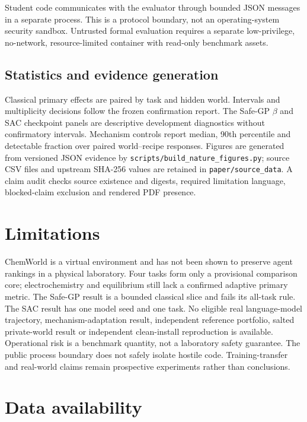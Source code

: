 \documentclass[11pt]{article}
\begin{document}
Student code communicates with the evaluator through bounded JSON messages in a separate process. This is a protocol boundary, not an operating-system security sandbox. Untrusted formal evaluation requires a separate low-privilege, no-network, resource-limited container with read-only benchmark assets.

\subsection*{Statistics and evidence generation}

Classical primary effects are paired by task and hidden world. Intervals and multiplicity decisions follow the frozen confirmation report. The Safe-GP $\beta$ and SAC checkpoint panels are descriptive development diagnostics without confirmatory intervals. Mechanism controls report median, 90th percentile and detectable fraction over paired world--recipe responses. Figures are generated from versioned JSON evidence by \texttt{scripts/build\_nature\_figures.py}; source CSV files and upstream SHA-256 values are retained in \texttt{paper/source\_data}. A claim audit checks source existence and digests, required limitation language, blocked-claim exclusion and rendered PDF presence.

\section*{Limitations}

ChemWorld is a virtual environment and has not been shown to preserve agent rankings in a physical laboratory. Four tasks form only a provisional comparison core; electrochemistry and equilibrium still lack a confirmed adaptive primary metric. The Safe-GP result is a bounded classical slice and fails its all-task rule. The SAC result has one model seed and one task. No eligible real language-model trajectory, mechanism-adaptation result, independent reference portfolio, salted private-world result or independent clean-install reproduction is available. Operational risk is a benchmark quantity, not a laboratory safety guarantee. The public process boundary does not safely isolate hostile code. Training-transfer and real-world claims remain prospective experiments rather than conclusions.

\section*{Data availability}
\end{document}
